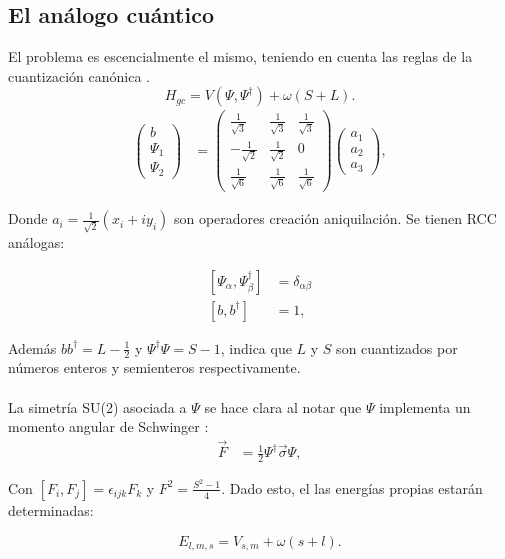 \documentclass[xcolor=dvipsnames]{beamer}
\newcommand{\roundP}[1]{\left( #1 \right)}
\begin{document}
\subsection{El análogo cuántico}
\begin{frame}
El problema es escencialmente el mismo, teniendo en cuenta las reglas de la cuantización canónica \cite{Cq}. 
\begin{equation*}
H_{gc} = V\roundP{\Psi,\Psi^\dagger}+ \omega (S+L).
\end{equation*}
\begin{align*}
\begin{pmatrix} b \\ \Psi_1 \\ \Psi_2 \end{pmatrix} &= 
\begin{pmatrix}\frac{1}{\sqrt{3}} &\frac{1}{\sqrt{3}}&\frac{1}{\sqrt{3}}\\
				-\frac{1}{\sqrt{2}}&\frac{1}{\sqrt{2}}&0\\
				\frac{1}{\sqrt{6}}&\frac{1}{\sqrt{6}}&\frac{1}{\sqrt{6}}\end{pmatrix}
				\begin{pmatrix} a_1 \\ a_2 \\ a_3 \end{pmatrix},
\end{align*}

Donde $a_i= \frac{1}{\sqrt{2}}(x_i+iy_i)$ son operadores creación aniquilación. Se tienen RCC análogas:

\begin{align*}
\left[ \Psi_\alpha,\Psi_\beta^\dagger\right] &= \delta_{\alpha\beta}\\
\left[ b,b^\dagger\right] &= 1,
\end{align*}


\end{frame}

\begin{frame}
Además $bb^\dagger = L-\frac{1}{2}$ y $\Psi^\dagger\Psi = S-1$, indica que $L$ y $S$ son cuantizados por números enteros y semienteros respectivamente. \\~\\

La simetría SU(2) asociada a $\Psi$ se hace clara al notar que $\Psi$ implementa un momento angular de Schwinger \cite{Schwinger}:
\begin{align*}
\vec{F} &= \frac{1}{2}\Psi^\dagger \vec{\sigma}\Psi,
\end{align*}

Con $[F_i,F_j] = \epsilon_{ijk}F_k$ y $F^2 = \frac{S^2 -1}{4}$. Dado esto, el las energías propias estarán determinadas:

\begin{equation*}
E_{l,m,s} = V_{s,m} + \omega(s+l).
\end{equation*}
\end{frame}
\end{document}
